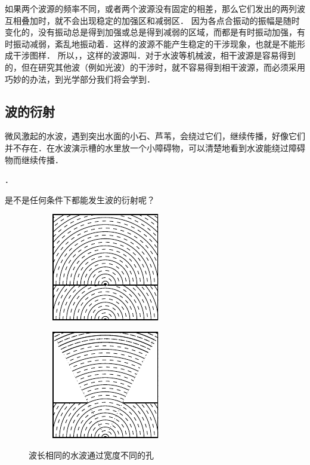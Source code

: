 如果两个波源的频率不同，或者两个波源没有固定的相差，那么它们发出的两列波互相叠加时，就不会出现稳定的加强区和减弱区．
因为各点合振动的振幅是随时变化的，没有振动总是得到加强或总是得到减弱的区域，而都是有时振动加强，有时振动减弱，紊乱地振动着．这样的波源不能产生稳定的干涉现象，也就是不能形成干涉图样．
所以，，这样的波源叫．对于水波等机械波，相干波源是容易得到的，但在研究其他波（例如光波）的干涉时，就不容易得到相干波源，而必须采用巧妙的办法，到光学部分我们将会学到．

\subsection{波的衍射}

微风激起的水波，遇到突出水面的小石、芦苇，会绕过它们，继续传播，好像它们并不存在．在水波演示槽的水里放一个小障碍物，可以清楚地看到水波能绕过障碍物而继续传播．

．

是不是任何条件下都能发生波的衍射呢？
\begin{figure}[htbp]
    \centering
    \begin{subfigure}{0.45\linewidth}
        \centering
        \includegraphics{fig/A/9-24a.pdf}
        \caption{}\label{fig_A_9-24a}
    \end{subfigure}
    \hfil
    \begin{subfigure}{0.45\linewidth}
        \centering
        \includegraphics{fig/A/9-24b.pdf}
        \caption{}\label{fig_A_9-24b}
    \end{subfigure}
    \caption{波长相同的水波通过宽度不同的孔}\label{fig_A_9-24}
\end{figure}


